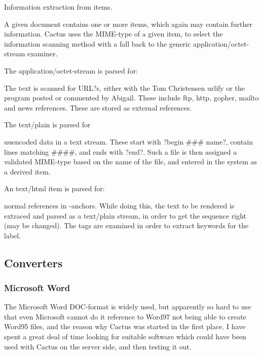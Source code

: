 Information extraction from items.



A given document contains one or more items, which again may contain
further information.  Cactus uses the MIME-type of a given item, to
select the information scanning method with a fall back to the generic
application/octet-stream examiner.

The application/octet-stream is parsed for:

The text is scanned for URL?s, either with the Tom Christensen urlify
or the program posted or commented by Abigail.  These include ftp,
http, gopher, mailto and news references.  These are stored as
external references.

The text/plain is parsed for

uuencoded data in a text stream.  These start with ?begin \#\#\#
name?, contain lines matching \#\#\#\#, and ends with ?end?.  Such a
file is then assigned a validated MIME-type based on the name of the
file, and entered in the system as a derived item.

An text/html item is parsed for:

normal references in -anchors.  While doing this, the text to
be rendered is extraced and parsed as a text/plain stream, in order to
get the sequence right (may be changed).  The  tags are
examined in order to extract keywords for the label.



\subsection{Converters}
\label{sec:converters}


\subsubsection{Microsoft Word}

The Microsoft Word DOC-format is widely used, but apparently so hard
to use that even Microsoft cannot do it \textsf{reference to Word97
  not being able to create Word95 files}, and the reason why Cactus
was started in the first place.  I have spent a great deal of time
looking for suitable software which could have been used with Cactus
on the server side, and then testing it out.

